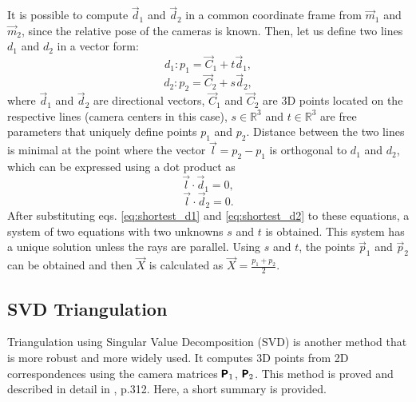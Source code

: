 It is possible to compute $\vec{d}_1$ and $\vec{d}_2$ in a common coordinate frame from $\vec{m}_1$ and $\vec{m}_2$, since the relative pose of the cameras is known.
Then, let us define two lines $d_1$ and $d_2$ in a vector form:
\begin{equation}
    \label{eq:shortest_d1}
    d_1: p_1 = \vec{C}_1 + t \vec{d}_1,
\end{equation}
\begin{equation}
    \label{eq:shortest_d2}
    d_2: p_2 = \vec{C}_2 + s \vec{d}_2,
\end{equation}
where $\vec{d}_1$ and $\vec{d}_2$ are directional vectors, $\vec{C}_1$ and $\vec{C}_2$ are 3D points located on the respective lines (camera centers in this case), $s \in \mathbb{R}^{3}$ and $t \in \mathbb{R}^3$ are free parameters that uniquely define points $p_1$ and $p_2$. 
Distance between the two lines is minimal at the point where the vector $\vec{l} = p_2 - p_1$ is orthogonal to $d_1$ and $d_2$, which can be expressed using a dot product as 
\begin{equation}
    \label{eq:ldd1}
    \vec{l} \cdot \vec{d}_1 = 0,
\end{equation}
\begin{equation}
    \label{eq:ldd2}
    \vec{l} \cdot \vec{d}_2 = 0.
\end{equation}
After substituting eqs. \eqref{eq:shortest_d1} and \eqref{eq:shortest_d2} to these equations, a system of two equations with two unknowns $s$ and $t$ is obtained.
This system has a unique solution unless the rays are parallel.
Using $s$ and $t$, the points $\vec{p}_1$ and $\vec{p}_2$ can be obtained and then $\vec{X}$ is calculated as $\vec{X} = \frac{p_1 + p_2}{2}$.

\subsection{SVD Triangulation}
\label{sec:svdtriang}
Triangulation using Singular Value Decomposition (SVD) is another method that is more robust and more widely used.
It computes 3D points from 2D correspondences using the camera matrices $\pmb{\mathsf{P}}_1$, $\pmb{\mathsf{P}}_2$. 
This method is proved and described in detail in \cite{hartley_zisserman_2004}, p.312. Here, a short summary is provided.

